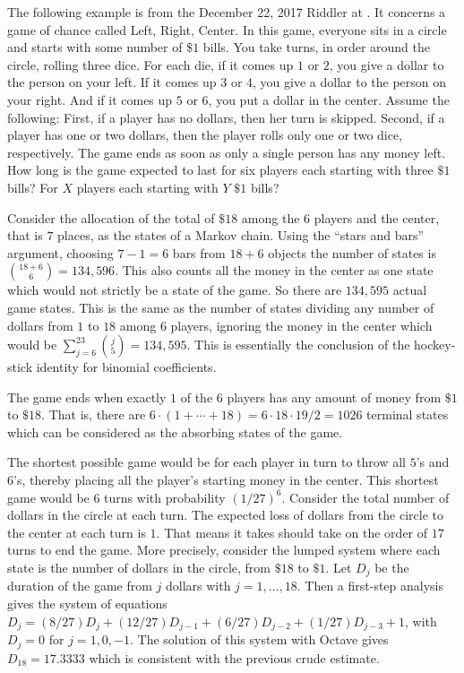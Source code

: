 \documentclass[12pt]{article}
\begin{document}
\begin{example}
  The following example is from the December 22, 2017 Riddler at
  .
  It concerns a game of chance called Left, Right, Center. In this
  game, everyone sits in a circle and starts with some number of $\$1$
  bills. You take turns, in order around the circle, rolling three
  dice. For each die, if it comes up $1$ or $2$, you give a dollar to
  the person on your left. If it comes up $3$ or $4$, you give a
  dollar to the person on your right. And if it comes up $5$ or $6$,
  you put a dollar in the center.  Assume the following: First, if a
  player has no dollars, then her turn is skipped. Second, if a player
  has one or two dollars, then the player rolls only one or two dice,
  respectively. The game ends as soon as only a single person has any
  money left. How long is the game expected to last for six players
  each starting with three $\$1$ bills? For $X$ players each starting
  with $Y$ $\$1$ bills?

  Consider the allocation of the total of $\$18$ among the $6$ players
  and the center, that is $7$ places, as the states of a Markov
  chain.  Using the ``stars and bars'' argument, choosing $7-1 = 6$ bars
  from $18 + 6$ objects the number of states is
  $\binom{18+6}{6} = 134{,}596$.  This also counts all the money in the
  center as one state which would not strictly be a state of the
  game.  So there are $134{,}595$ actual game states.  This is the same as the number of
  states dividing any number of dollars from $1$ to $18$ among $6$
  players, ignoring the money in the center which would be
  $\sum\limits_{j=6}^{23}\binom{j}{5} = 134{,}595$.  This is essentially the
  conclusion of the hockey-stick identity for binomial coefficients.

  The game ends when exactly $1$ of the $6$ players has any amount of
  money from $\$1$ to $\$18$.  That is, there are $6 \cdot (1 + \cdots
  + 18) = 6 \cdot 18 \cdot 19/2 = 1026$ terminal states which can be
  considered as the absorbing states of the game.

  The shortest possible game would be for each player in turn to throw
  all $5$'s and $6$'s, thereby placing all the player's starting money
  in the center.  This shortest game would be $6$ turns with
  probability $(1/27)^6$.  Consider the
  total number of dollars in the circle at each turn.  The expected
  loss of dollars from the circle to the center at each turn is $1$.
  That means it takes should take on the order of $17$ turns to end
  the game.  More precisely, consider the lumped system where each
  state is the number of dollars in the circle, from $\$18$ to $\$1$.
  Let $D_j$ be the duration of the game from $j$ dollars with
  $j = 1, \dots, 18$.  Then a first-step analysis gives the system of
  equations $D_j = (8/27)D_j + (12/27)D_{j-1} + (6/27)D_{j-2} +
  (1/27)D_{j-3} + 1$, with $D_j = 0$ for $j = 1, 0, -1$.  The solution
  of this system with Octave gives $D_{18} = 17.3333$ which is
  consistent with the previous crude estimate.


\end{example}
\end{document}
